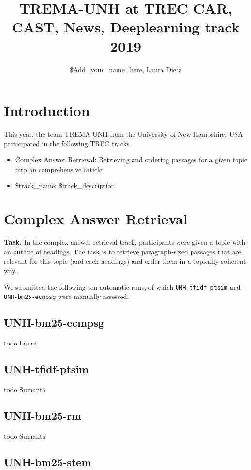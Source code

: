 \documentclass{article}
\title{TREMA-UNH at TREC CAR, CAST, News, Deeplearning track 2019}
\author{\$Add\_your\_name\_here, Laura Dietz }
\date{}
\begin{document}
\maketitle

\section{Introduction}
This year, the team TREMA-UNH from the University of New Hampshire, USA participated in the following TREC tracks

\begin{itemize}
    \item Complex Answer Retrieval: Retrieving and ordering passages for a given topic into an comprehensive article.
    \item \$track\_name:  \$track\_description
\end{itemize}


\section{Complex Answer Retrieval}

\textbf{Task.} In the complex answer retrieval track, participants were given a topic with an outline of headings. The task is to retrieve paragraph-sized passages that are relevant for this topic (and each headings) and order them in a topically coherent way.

We submitted the following ten automatic runs, of which \texttt{UNH-tfidf-ptsim} and \texttt{UNH-bm25-ecmpsg} were manually assessed. 

\subsection{UNH-bm25-ecmpsg}

todo Laura 

\subsection{UNH-tfidf-ptsim}

todo Sumanta 

\subsection{UNH-bm25-rm}

todo Sumanta 


\subsection{UNH-bm25-stem}
\end{document}
